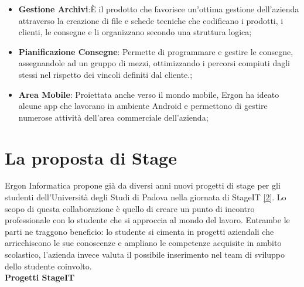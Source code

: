 \begin{itemize}
	\item \textbf{Gestione Archivi}:È il prodotto che favorisce un’ottima gestione dell’azienda attraverso la creazione di file e schede tecniche che codificano
	 i prodotti, i clienti, le consegne e li organizzano secondo una struttura logica;
	
	\item \textbf{Pianificazione Consegne}: Permette di programmare e gestire le consegne, assegnandole ad un gruppo di mezzi, ottimizzando i percorsi
	 compiuti dagli stessi nel rispetto dei vincoli definiti dal cliente.;
	
	\item \textbf{Area Mobile}: Proiettata anche verso il mondo mobile, Ergon ha ideato alcune app che lavorano in ambiente Android e permettono di 
	gestire numerose attività dell'area commerciale dell'azienda;
	
	
\end{itemize}

\section{La proposta di Stage}

Ergon Informatica propone già da diversi anni nuovi progetti di stage per gli studenti dell'Università degli Studi di Padova nella giornata di 
StageIT \hyperref[sec:ergon2]{[2]}. Lo scopo di questa collaborazione è quello di creare un punto di incontro professionale con lo studente che si approccia al mondo del lavoro. Entrambe le parti ne traggono beneficio: lo studente si cimenta in progetti aziendali che arricchiscono le sue conoscenze e ampliano le competenze acquisite in ambito scolastico, l'azienda invece valuta il possibile inserimento nel team di sviluppo dello studente coinvolto.\\

\textbf{Progetti StageIT}

